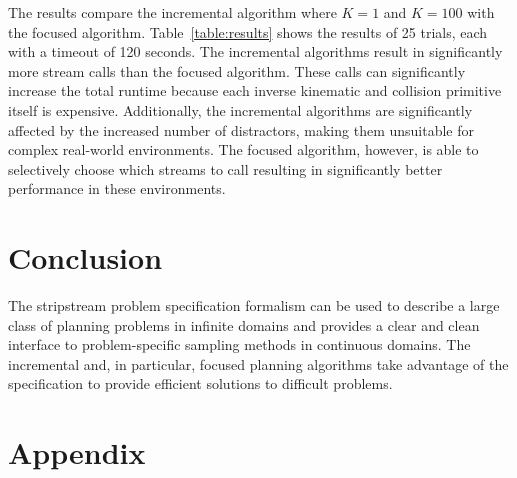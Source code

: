 \documentclass[letterpaper]{article} %
\theoremstyle{plain}\newtheorem{thm}{Theorem}
\theoremstyle{definition}\newtheorem{defn}{Definition}
\theoremstyle{plain}\newtheorem{lem}{Lemma}
\theoremstyle{plain}\newtheorem{cor}{Corollary}
\newcommand{\algname}{{\sc strips}tream}
\newcommand{\eager}{incremental}
\newcommand{\focused}{focused}
\begin{document}
The results compare the \eager{} algorithm where $K=1$ and $K=100$
with the \focused{} algorithm.  Table~\ref{table:results} shows the
results of 25 trials, each with a timeout of 120 seconds.
The \eager{} algorithms result in
significantly more stream calls than the focused algorithm.
These calls can significantly increase the total runtime
because each inverse kinematic and collision primitive itself is expensive.
Additionally, the \eager{} algorithms are significantly affected by
the increased number of distractors, making them unsuitable for
complex real-world environments. The \focused{} algorithm, however, is
able to selectively choose which streams to call resulting in
significantly better performance in these environments.

\section{Conclusion}

The \algname{} problem specification formalism can be used to describe
a large class of planning problems in infinite domains and provides a
clear and clean interface to problem-specific sampling methods in
continuous domains.  
The \eager{} and, in particular, \focused{} planning algorithms
take advantage of the specification to provide efficient solutions to
difficult problems.

\newpage



\newpage

\section{Appendix}

\end{document}
